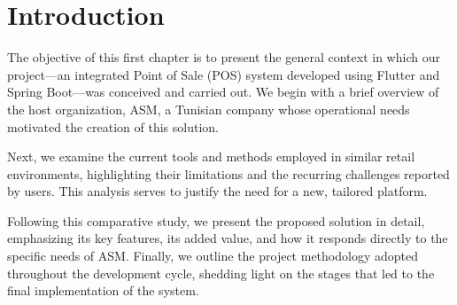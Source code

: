 \section*{Introduction}

The objective of this first chapter is to present the general context in which our project—an integrated Point of Sale (POS) system developed using Flutter and Spring Boot—was conceived and carried out. We begin with a brief overview of the host organization, ASM, a Tunisian company whose operational needs motivated the creation of this solution.

Next, we examine the current tools and methods employed in similar retail environments, highlighting their limitations and the recurring challenges reported by users. This analysis serves to justify the need for a new, tailored platform.

Following this comparative study, we present the proposed solution in detail, emphasizing its key features, its added value, and how it responds directly to the specific needs of ASM. Finally, we outline the project methodology adopted throughout the development cycle, shedding light on the stages that led to the final implementation of the system.
